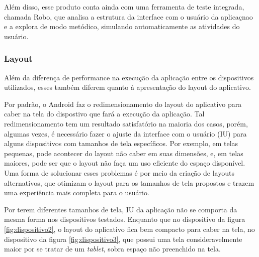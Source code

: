 Além disso, esse produto conta ainda com uma ferramenta de teste integrada, chamada Robo, que analisa a estrutura da interface com o usuário da aplicaçnao e a explora de modo metódico, simulando automaticamente as atividades do usuário.

\subsubsection{Layout}

Além da diferença de performance na execução da aplicação entre os dispositivos utilizados, esses também diferem quanto à apresentação do layout do aplicativo. 

Por padrão, o Android faz o redimensionamento do layout do aplicativo para caber na tela do dispostivo que fará a execução da aplicação. Tal redimensionamento tem um resultado satisfatório na maioria dos casos, porém, algumas vezes, é necessário fazer o ajuste da interface com o usuário (IU) para alguns dispositivos com tamanhos de tela específicos. Por exemplo, em telas pequenas, pode acontecer do layout não caber em suas dimensões, e, em telas maiores, pode ser que o layout não faça um uso eficiente do espaço disponível. Uma forma de solucionar esses problemas é por meio da criação de layouts alternativos, que otimizam o layout para os tamanhos de tela propostos e trazem uma experiência mais completa para o usuário. 

Por terem diferentes tamanhos de tela, IU da aplicação não se comporta da mesma forma nos dispositivos testados. Enquanto que no dispositivo da figura \ref{fig:dispositivo2}, o layout do aplicativo fica bem compacto para caber na tela, no dispositivo da figura \ref{fig:dispositivo3}, que possui uma tela consideravelmente maior por se tratar de um \textit{tablet}, sobra espaço não preenchido na tela.